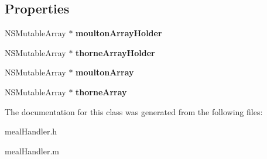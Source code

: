 \subsection*{Properties}
\begin{DoxyCompactItemize}
\item 
\hypertarget{interfacemeal_handler_afd31095f1c34e7e104d5016144cd97cf}{
NSMutableArray $\ast$ {\bfseries moultonArrayHolder}}
\label{interfacemeal_handler_afd31095f1c34e7e104d5016144cd97cf}

\item 
\hypertarget{interfacemeal_handler_aa323dea93a58913caffc5b68ebe44976}{
NSMutableArray $\ast$ {\bfseries thorneArrayHolder}}
\label{interfacemeal_handler_aa323dea93a58913caffc5b68ebe44976}

\item 
\hypertarget{interfacemeal_handler_a377979966c237815197ead9826aaac07}{
NSMutableArray $\ast$ {\bfseries moultonArray}}
\label{interfacemeal_handler_a377979966c237815197ead9826aaac07}

\item 
\hypertarget{interfacemeal_handler_ad9a09713283f6ef4173b9c576cfeac5c}{
NSMutableArray $\ast$ {\bfseries thorneArray}}
\label{interfacemeal_handler_ad9a09713283f6ef4173b9c576cfeac5c}

\end{DoxyCompactItemize}


The documentation for this class was generated from the following files:\begin{DoxyCompactItemize}
\item 
mealHandler.h\item 
mealHandler.m\end{DoxyCompactItemize}
